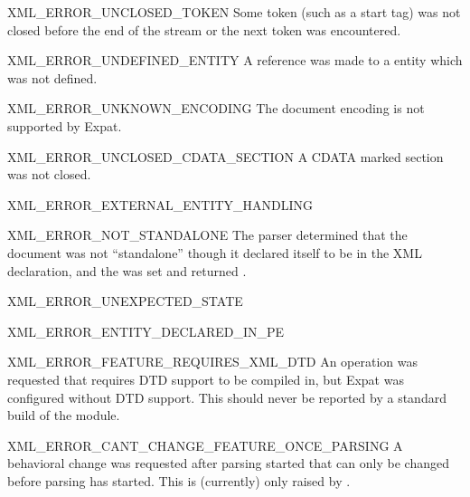 \begin{datadescni}{XML_ERROR_UNCLOSED_TOKEN}
Some token (such as a start tag) was not closed before the end of the
stream or the next token was encountered.
\end{datadescni}

\begin{datadescni}{XML_ERROR_UNDEFINED_ENTITY}
A reference was made to a entity which was not defined.
\end{datadescni}

\begin{datadescni}{XML_ERROR_UNKNOWN_ENCODING}
The document encoding is not supported by Expat.
\end{datadescni}

\begin{datadescni}{XML_ERROR_UNCLOSED_CDATA_SECTION}
A CDATA marked section was not closed.
\end{datadescni}

\begin{datadescni}{XML_ERROR_EXTERNAL_ENTITY_HANDLING}
\end{datadescni}

\begin{datadescni}{XML_ERROR_NOT_STANDALONE}
The parser determined that the document was not ``standalone'' though
it declared itself to be in the XML declaration, and the
 was set and returned .
\end{datadescni}

\begin{datadescni}{XML_ERROR_UNEXPECTED_STATE}
\end{datadescni}

\begin{datadescni}{XML_ERROR_ENTITY_DECLARED_IN_PE}
\end{datadescni}

\begin{datadescni}{XML_ERROR_FEATURE_REQUIRES_XML_DTD}
An operation was requested that requires DTD support to be compiled
in, but Expat was configured without DTD support.  This should never
be reported by a standard build of the 
module.
\end{datadescni}

\begin{datadescni}{XML_ERROR_CANT_CHANGE_FEATURE_ONCE_PARSING}
A behavioral change was requested after parsing started that can only
be changed before parsing has started.  This is (currently) only
raised by .
\end{datadescni}

